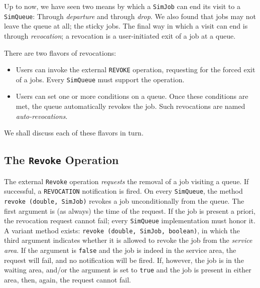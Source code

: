 Up to now,
we have seen two means by which a \lstinline|SimJob|
can end its visit to a \lstinline|SimQueue|:
Through {\em departure\/}
and through {\em drop}.
We also found that jobs may not leave the queue at all;
the sticky jobs.
The final way in which a visit can end is through {\em revocation};
a revocation is a user-initiated exit of a job at a queue.

There are two flavors of revocations:
\begin{itemize}
	\item
	Users can invoke the external \lstinline|REVOKE| operation,
	requesting for the forced exit of a jobs.
	Every \lstinline|SimQueue| must support the operation.
	\item
	Users can set one or more conditions on a queue.
	Once these conditions are met, the queue automatically
	revokes the job.
	Such revocations are named {\em auto-revocations}.
\end{itemize}

We shall discuss each of these flavors in turn.

\subsection{The \texttt{Revoke} Operation}

The external \lstinline|Revoke| operation
{\em requests\/} the removal of a job visiting a queue.
If successful,
a \lstinline|REVOCATION| notification is fired.
On every \lstinline|SimQueue|,
the method \lstinline|revoke (double, SimJob)|
revokes a job unconditionally from the queue.
The first argument is (as always)
the time of the request.
If the job is present a priori,
the revocation request cannot fail;
every \lstinline|SimQueue| implementation
must honor it.
A variant method exists: \lstinline|revoke (double, SimJob, boolean)|,
in which the third argument indicates
whether it is allowed to revoke the job
from the {\em service area}.
If the argument is \lstinline|false| and the job is indeed
in the service area,
the request will fail,
and no notification will be fired.
If, however, the job is in the waiting area,
and/or the argument is set to \lstinline|true|
and the job is present in either area,
then, again, the request cannot fail.

